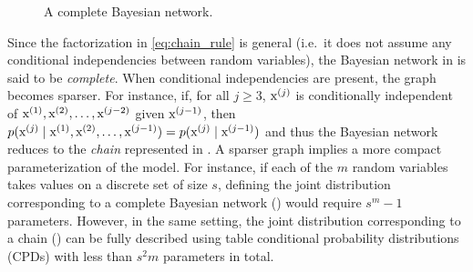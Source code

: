 \begin{figure}
    \centering
    \caption{A complete Bayesian network.}
    \label{fig:complete_bayesian_net}
\end{figure}

Since the factorization in \eqref{eq:chain_rule} is general (i.e.\ it does not assume any conditional independencies between random variables), the Bayesian network in  is said to be \emph{complete}. When conditional independencies are present, the graph becomes sparser. For instance, if, for all $j \geq 3$, ${\textnormal{x}}^{(j)}$ is conditionally independent of ${\textnormal{x}}^{(1)}, {\textnormal{x}}^{(2)}, \dots, {\textnormal{x}}^{(j-2)}$ given ${\textnormal{x}}^{(j-1)}$, then $p({\textnormal{x}}^{(j)} \mid {\textnormal{x}}^{(1)}, {\textnormal{x}}^{(2)}, \dots, {\textnormal{x}}^{(j-1)}) = p({\textnormal{x}}^{(j)} \mid {\textnormal{x}}^{(j-1)})$ and thus the Bayesian network reduces to the \emph{chain} represented in . A sparser graph implies a more compact parameterization of the model. For instance, if each of the $m$ random variables takes values on a discrete set of size $s$, defining the joint distribution corresponding to a complete Bayesian network () would require $s^{m}-1$ parameters. However, in the same setting, the joint distribution corresponding to a chain () can be fully described using table conditional probability distributions (CPDs) with less than $s^2m$ parameters in total.

